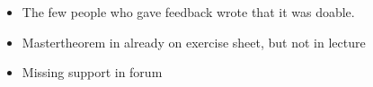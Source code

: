 \begin{frame}{\LectureFeedbackExercisesTitle}
  \begin{itemize}
  \item <2->The few people who gave feedback wrote that it was doable.
  \item <3->Mastertheorem in already on exercise sheet, but not in lecture
  \item <4->Missing support in forum
  \end{itemize}
\end{frame}
